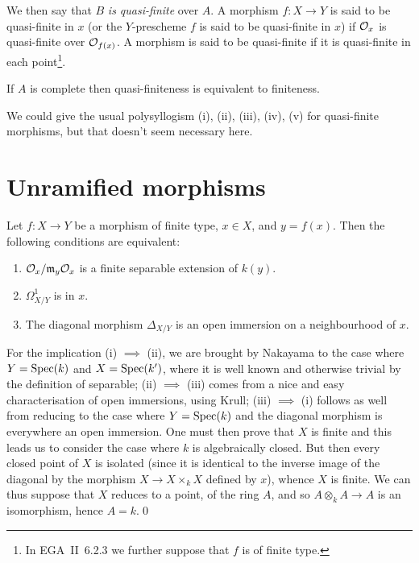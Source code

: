 We then say that $B$ \emph{is quasi-finite} over $A$.
A morphism $f\colon X\to Y$ is said to be quasi-finite in $x$ (or the $Y$-prescheme $f$ is said to be quasi-finite in $x$) if $\mathcal{O}_x$ is quasi-finite over $\mathcal{O}_{f(x)}$.
\completelyunsure
A morphism is said to be quasi-finite if it is quasi-finite in each point\footnote{In EGA~II~6.2.3 we further suppose that $f$ is of finite type.}.

\begin{cor}
    If $A$ is complete then quasi-finiteness is equivalent to finiteness.
\end{cor}

We could give the usual polysyllogism (i), (ii), (iii), (iv), (v) for quasi-finite morphisms, but that doesn't seem necessary here.


\section{Unramified morphisms}

\begin{prop}
    Let $f\colon X\to Y$ be a morphism of finite type, $x\in X$, and $y=f(x)$.
    Then the following conditions are equivalent:
    \begin{enumerate}[\normalfont(i)]
        \item $\mathcal{O}_x/\mathfrak{m}_y\mathcal{O}_x$ is a finite separable extension of $k(y)$.
        \item $\Omega_{X/Y}^1$ is  in $x$.
        \item The diagonal morphism $\Delta_{X/Y}$ is an open immersion on a neighbourhood of $x$.
    \end{enumerate}
\end{prop}

For the implication (i) $\implies$ (ii), we are brought by Nakayama to the case where $Y=\operatorname{Spec}(k)$ and $X=\operatorname{Spec}(k')$, where it is well known and otherwise trivial by the definition of separable; (ii) $\implies$ (iii) comes from a nice and easy characterisation of open immersions, using Krull; (iii) $\implies$ (i) follows as well from reducing to the case where $Y=\operatorname{Spec}(k)$ and the diagonal morphism is everywhere an open immersion.
One must then prove that $X$ is finite \completelyunsure and this leads us to consider the case where $k$ is algebraically closed.
But then every closed point of $X$ is isolated (since it is identical to the inverse image of the diagonal by the morphism $X\to X\times_k X$ defined by $x$), whence $X$ is finite.
We can thus suppose that $X$ reduces to a point, of the ring $A$, and so $A\otimes_k A\to A$ is an isomorphism, hence $A=k$.\qed


